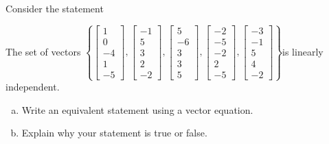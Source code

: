 
\begin{exerciseStatement}


Consider the statement 
\begin{center}\begin{minipage}{0.8\textwidth}
 The set of vectors \( \left\{ \left[\begin{array}{c}
1 \\
0 \\
-4 \\
1 \\
-5
\end{array}\right] , \left[\begin{array}{c}
-1 \\
5 \\
3 \\
2 \\
-2
\end{array}\right] , \left[\begin{array}{c}
5 \\
-6 \\
3 \\
3 \\
5
\end{array}\right] , \left[\begin{array}{c}
-2 \\
-5 \\
-2 \\
2 \\
-5
\end{array}\right] , \left[\begin{array}{c}
-3 \\
-1 \\
5 \\
4 \\
-2
\end{array}\right] \right\} \)is linearly independent.
\end{minipage}\end{center}
    


\begin{enumerate}[(a)]
\item  Write an equivalent statement using a vector equation.
\item  Explain why your statement is true or false.
\end{enumerate}
    
\end{exerciseStatement}
    
